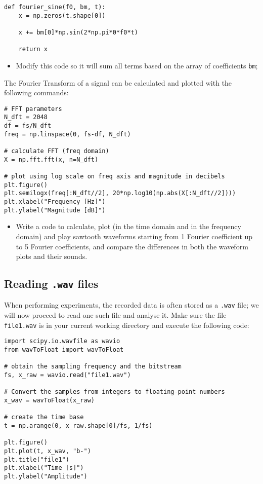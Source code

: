 \begin{lstlisting}[frame=single]
def fourier_sine(f0, bm, t):
    x = np.zeros(t.shape[0])

    x += bm[0]*np.sin(2*np.pi*0*f0*t)

    return x
\end{lstlisting}

\begin{itemize}
	\item Modify this code so it will sum all terms based on the array of coefficients {\tt bm};
\end{itemize}

The Fourier Transform of a signal can be calculated and plotted with the following commands:

\begin{lstlisting}[frame=single]
# FFT parameters
N_dft = 2048
df = fs/N_dft
freq = np.linspace(0, fs-df, N_dft)

# calculate FFT (freq domain)
X = np.fft.fft(x, n=N_dft)

# plot using log scale on freq axis and magnitude in decibels
plt.figure()
plt.semilogx(freq[:N_dft//2], 20*np.log10(np.abs(X[:N_dft//2])))
plt.xlabel("Frequency [Hz]")
plt.ylabel("Magnitude [dB]")
\end{lstlisting}

\begin{itemize}
	\item Write a code to calculate, plot (in the time domain and in the frequency domain) and play sawtooth waveforms starting from 1 Fourier coefficient up to 5 Fourier coefficients, and compare the differences in both the waveform plots and their sounds.
\end{itemize}


\subsection{Reading {\tt .wav} files}

When performing experiments, the recorded data is often stored as a {\tt .wav} file; we will now proceed to read one such file and analyse it. Make sure the file {\tt file1.wav} is in your current working directory and execute the following code:

\begin{lstlisting}[frame=single]
import scipy.io.wavfile as wavio
from wavToFloat import wavToFloat

# obtain the sampling frequency and the bitstream
fs, x_raw = wavio.read("file1.wav")

# Convert the samples from integers to floating-point numbers
x_wav = wavToFloat(x_raw)

# create the time base
t = np.arange(0, x_raw.shape[0]/fs, 1/fs)

plt.figure()
plt.plot(t, x_wav, "b-")
plt.title("file1")
plt.xlabel("Time [s]")
plt.ylabel("Amplitude")
\end{lstlisting}

